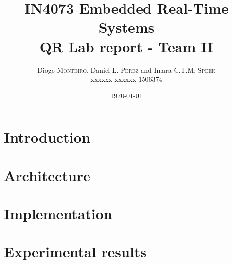 \documentclass{article}
\title{IN4073 Embedded Real-Time Systems \\ QR Lab report - Team II} %
\author{Diogo \textsc{Monteiro}, Daniel L. \textsc{Perez} and Imara C.T.M. \textsc{Speek} \\
		xxxxxx xxxxxx 1506374} %
\date{\today} %
\begin{document}
\maketitle %

 \begin{abstract}


 \end{abstract}


\section{Introduction}
\label{sec:introduction}



\section{Architecture}
\label{sec:architecture}



\section{Implementation}
\label{sec:implementation}



\section{Experimental results}
\label{sec:results}
\end{document}
